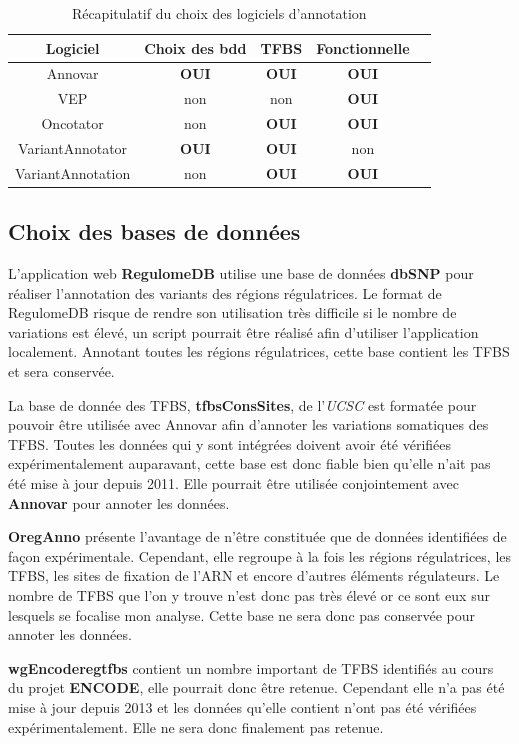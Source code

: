 \begin{table}[h]
\centering
\begin{tabular}{|c|c|c|c|c|}
\hline
Logiciel & Choix des bdd & TFBS & Fonctionnelle \\
\hline
Annovar & \textbf{OUI} & \textbf{OUI} & \textbf{OUI}\\
\hline
VEP & non & non & \textbf{OUI}\\
\hline
Oncotator & non & \textbf{OUI} & \textbf{OUI}\\
\hline
VariantAnnotator & \textbf{OUI} & \textbf{OUI} & non\\
\hline
VariantAnnotation & non & \textbf{OUI} & \textbf{OUI}\\
\hline
\end{tabular}
\caption{Récapitulatif du choix des logiciels d'annotation}
\end{table}

\subsection{Choix des bases de données}

L'application web \textbf{RegulomeDB} utilise une base de données \textbf{dbSNP} pour réaliser l'annotation des variants des régions régulatrices. Le format de RegulomeDB risque de rendre son utilisation très difficile si le nombre de variations est élevé, un script pourrait être réalisé afin d'utiliser l'application localement. Annotant toutes les régions régulatrices, cette base contient les TFBS et sera conservée.

La base de donnée des TFBS, \textbf{tfbsConsSites}, de l'\textit{UCSC} est formatée pour pouvoir être utilisée avec Annovar afin d'annoter les variations somatiques des TFBS. Toutes les données qui y sont intégrées doivent avoir été vérifiées expérimentalement auparavant, cette base est donc fiable bien qu'elle n'ait pas été mise à jour depuis 2011. Elle pourrait être utilisée conjointement avec \textbf{Annovar} pour annoter les données. 

\textbf{OregAnno} présente l'avantage de n'être constituée que de données identifiées de façon expérimentale. Cependant, elle regroupe à la fois les régions régulatrices, les TFBS, les sites de fixation de l'ARN et encore d'autres éléments régulateurs. Le nombre de TFBS que l'on y trouve n'est donc pas très élevé or ce sont eux sur lesquels se focalise mon analyse. Cette base ne sera donc pas conservée pour annoter les données.

\textbf{wgEncoderegtfbs} contient un nombre important de TFBS identifiés au cours du projet \textbf{ENCODE}, elle pourrait donc être retenue. Cependant elle n'a pas été mise à jour depuis 2013 et les données qu'elle contient n'ont pas été vérifiées expérimentalement. Elle ne sera donc finalement pas retenue.

